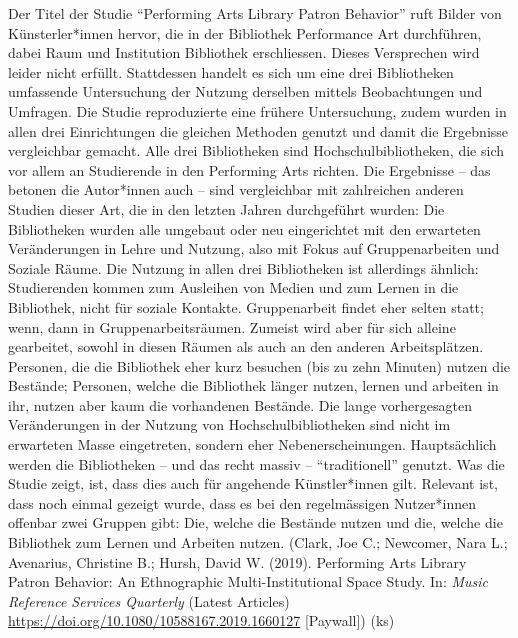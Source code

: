 \documentclass[a4paper,
fontsize=11pt,
oneside,
numbers=noperiodatend,
parskip=half-,
bibliography=totoc,
final
]{scrartcl}
\begin{document}
Der Titel der Studie \enquote{Performing Arts Library Patron Behavior}
ruft Bilder von Künsterler*innen hervor, die in der Bibliothek
Performance Art durchführen, dabei Raum und Institution Bibliothek
erschliessen. Dieses Versprechen wird leider nicht erfüllt. Stattdessen
handelt es sich um eine drei Bibliotheken umfassende Untersuchung der
Nutzung derselben mittels Beobachtungen und Umfragen. Die Studie
reproduzierte eine frühere Untersuchung, zudem wurden in allen drei
Einrichtungen die gleichen Methoden genutzt und damit die Ergebnisse
vergleichbar gemacht. Alle drei Bibliotheken sind Hochschulbibliotheken,
die sich vor allem an Studierende in den Performing Arts richten. Die
Ergebnisse -- das betonen die Autor*innen auch -- sind vergleichbar mit
zahlreichen anderen Studien dieser Art, die in den letzten Jahren
durchgeführt wurden: Die Bibliotheken wurden alle umgebaut oder neu
eingerichtet mit den erwarteten Veränderungen in Lehre und Nutzung, also
mit Fokus auf Gruppenarbeiten und Soziale Räume. Die Nutzung in allen
drei Bibliotheken ist allerdings ähnlich: Studierenden kommen zum
Ausleihen von Medien und zum Lernen in die Bibliothek, nicht für soziale
Kontakte. Gruppenarbeit findet eher selten statt; wenn, dann in
Gruppenarbeitsräumen. Zumeist wird aber für sich alleine gearbeitet,
sowohl in diesen Räumen als auch an den anderen Arbeitsplätzen.
Personen, die die Bibliothek eher kurz besuchen (bis zu zehn Minuten)
nutzen die Bestände; Personen, welche die Bibliothek länger nutzen,
lernen und arbeiten in ihr, nutzen aber kaum die vorhandenen Bestände.
Die lange vorhergesagten Veränderungen in der Nutzung von
Hochschulbibliotheken sind nicht im erwarteten Masse eingetreten,
sondern eher Nebenerscheinungen. Hauptsächlich werden die Bibliotheken
-- und das recht massiv -- \enquote{traditionell} genutzt. Was die
Studie zeigt, ist, dass dies auch für angehende Künstler*innen gilt.
Relevant ist, dass noch einmal gezeigt wurde, dass es bei den
regelmässigen Nutzer*innen offenbar zwei Gruppen gibt: Die, welche die
Bestände nutzen und die, welche die Bibliothek zum Lernen und Arbeiten
nutzen. (Clark, Joe C.; Newcomer, Nara L.; Avenarius, Christine B.;
Hursh, David W. (2019). Performing Arts Library Patron Behavior: An
Ethnographic Multi-Institutional Space Study. In: \emph{Music Reference
Services Quarterly} (Latest Articles)
\url{https://doi.org/10.1080/10588167.2019.1660127} {[}Paywall{]}) (ks)
\end{document}
